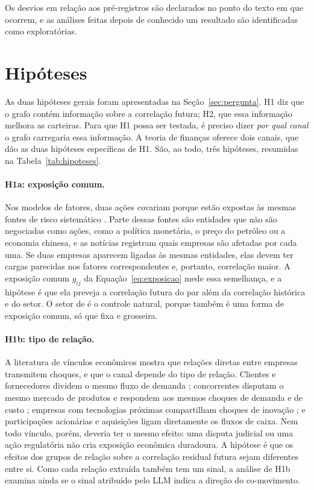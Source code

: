 Os desvios em relação aos pré-registros são declarados no ponto do texto em que ocorrem, e as análises
feitas depois de conhecido um resultado são identificadas como exploratórias.

\section{Hipóteses}
\label{sec:hipoteses}

As duas hipóteses gerais foram apresentadas na Seção~\ref{sec:pergunta}. H1 diz que o grafo contém
informação sobre a correlação futura; H2, que essa informação melhora as carteiras. Para que H1 possa ser
testada, é preciso dizer \emph{por qual canal} o grafo carregaria essa informação. A teoria de finanças
oferece dois canais, que dão as duas hipóteses específicas de H1. São, ao todo, três hipóteses,
resumidas na Tabela~\ref{tab:hipoteses}.

\paragraph{H1a: exposição comum.} Nos modelos de fatores, duas ações covariam porque estão expostas às
mesmas fontes de risco sistemático \citep{ross1976,chan1999}. Parte dessas fontes são entidades que não
são negociadas como ações, como a política monetária, o preço do petróleo ou a economia chinesa, e as
notícias registram quais empresas são afetadas por cada uma. Se duas empresas aparecem ligadas às mesmas
entidades, elas devem ter cargas parecidas nos fatores correspondentes e, portanto, correlação maior. A
exposição comum $g_{ij}$ da Equação~\eqref{eq:exposicao} mede essa semelhança, e a hipótese é que ela
preveja a correlação futura do par além da correlação histórica e do setor. O setor de
\citet{elton1973} é o controle natural, porque também é uma forma de exposição comum, só que fixa e
grosseira.

\paragraph{H1b: tipo de relação.} A literatura de vínculos econômicos mostra que relações diretas entre
empresas transmitem choques, e que o canal depende do tipo de relação. Clientes e fornecedores dividem
o mesmo fluxo de demanda \citep{cohen2008,menzly2010}; concorrentes disputam o mesmo mercado de produtos e
respondem aos mesmos choques de demanda e de custo \citep{hoberg2016}; empresas com tecnologias próximas
compartilham choques de inovação \citep{lee2019}; e participações acionárias e aquisições ligam
diretamente os fluxos de caixa. Nem todo vínculo, porém, deveria ter o mesmo efeito: uma disputa
judicial ou uma ação regulatória não cria exposição econômica duradoura. A hipótese é que os efeitos dos
grupos de relação sobre a correlação residual futura sejam diferentes entre si. Como cada relação
extraída também tem um sinal, a análise de H1b examina ainda se o sinal atribuído pelo LLM indica a
direção do co-movimento.


